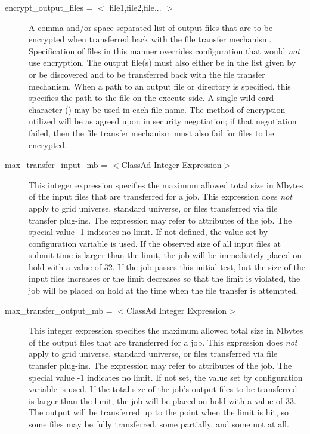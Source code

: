 \begin{description}

\label{man-condor-submit-encrypt-output-files}
\item[encrypt\_output\_files = $<$ file1,file2,file... $>$] 
A comma and/or space separated list of output files that are to be
encrypted when transferred back with the file transfer mechanism.
Specification of files in this manner overrides configuration that would
\emph{not} use encryption.
The output file(s) must also either be in the list given by
 or be discovered and to be transferred
back with the file transfer mechanism.
When a path to an output file or directory is specified, 
this specifies the path to the file on the execute side.
A single wild card character (\Expr{*}) may be used in each file name.
The method of encryption utilized will be as agreed upon in security
negotiation; if that negotiation failed, then the file transfer
mechanism must also fail for files to be encrypted.


\label{man-condor-submit-max-transfer-input-mb}
\item[max\_transfer\_input\_mb = $<$ClassAd Integer Expression$>$] 
This integer expression specifies the maximum allowed total size in
Mbytes of the input files that are transferred for a job.  This
expression does \emph{not} apply to grid universe, standard universe, or
files transferred via file transfer plug-ins.  The expression may refer
to attributes of the job.  The special value -1 indicates no limit.
If not defined, the value set by configuration variable
 is used.  
If the observed size of all input files at submit time is
larger than the limit, the job will be immediately placed on hold with
a  value of 32.
If the job passes this initial test, but the size of
the input files increases or the limit decreases so that the limit is
violated, the job will be placed on hold at the time when the file
transfer is attempted.

\label{man-condor-submit-max-transfer-output-mb}
\item[max\_transfer\_output\_mb = $<$ClassAd Integer Expression$>$] 
This integer expression specifies the maximum allowed total size in
Mbytes of the output files that are transferred for a job.  This
expression does \emph{not} apply to grid universe, standard universe, or
files transferred via file transfer plug-ins.  The expression may refer
to attributes of the job.  The special value -1 indicates no limit.
If not set, the value set by configuration variable
 is used.  
If the total size of the job's output files to be transferred
is larger than the limit, the job will be placed on hold with
a  value of 33.
The output will be transferred up to the point when the
limit is hit, so some files may be fully transferred, some partially,
and some not at all.


\end{description}
